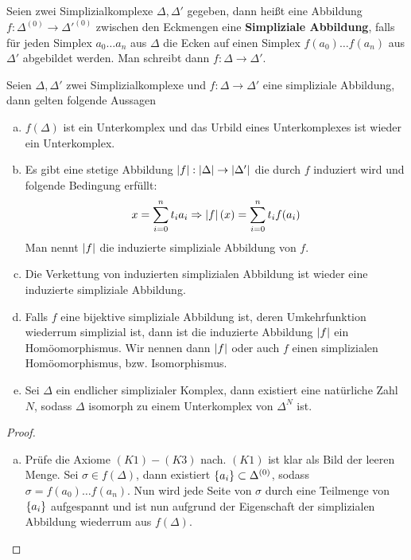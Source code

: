 \begin{Def} 
  Seien zwei Simplizialkomplexe $\Delta, \Delta'$ gegeben, dann heißt
  eine Abbildung $f: \Delta^{(0)} \rightarrow \Delta'^{(0)}$ zwischen
  den Eckmengen eine \textbf{Simpliziale Abbildung}, falls für jeden
  Simplex $a_0 \ldots a_n$ aus $\Delta$ die Ecken auf einen Simplex
  $f(a_0) \ldots f(a_n)$ aus $\Delta'$ abgebildet werden. Man schreibt
  dann $f: \Delta \rightarrow \Delta'$.
\end{Def}

\begin{Satz} \label{satz:geosimp}
  Seien $\Delta, \Delta'$ zwei Simplizialkomplexe und
  $f: \Delta \rightarrow \Delta'$ eine simpliziale Abbildung, dann
  gelten folgende Aussagen
	\begin{enumerate}[(a)]
        \item $f(\Delta)$ ist ein Unterkomplex und das Urbild eines
          Unterkomplexes ist wieder ein Unterkomplex.
        \item Es gibt eine stetige Abbildung
          $\left| f \right| : \left| \Delta \right| \rightarrow \left| \Delta' \right|$ die durch
          $f$ induziert wird und folgende Bedingung erfüllt:
          \begin{gather*}
            x = \sum\limits_{i=0}^{n} t_i a_i \Rightarrow \left| f \right|(x) = \sum\limits_{i=0}^{n}
            t_i f(a_i)
          \end{gather*}
          Man nennt $\left| f \right|$ die induzierte simpliziale Abbildung von
          $f$.
        \item Die Verkettung von induzierten simplizialen Abbildung
          ist wieder eine induzierte simpliziale Abbildung.
        \item Falls $f$ eine bijektive simpliziale Abbildung ist,
          deren Umkehrfunktion wiederrum simplizial ist, dann ist die
          induzierte Abbildung $\left| f \right|$ ein Homöomorphismus. Wir
          nennen dann $\left| f \right|$ oder auch $f$ einen simplizialen
          Homöomorphismus, bzw. Isomorphismus.
        \item Sei $\Delta$ ein endlicher simplizialer Komplex, dann
          existiert eine natürliche Zahl $N$, sodass $\Delta$
          isomorph zu einem Unterkomplex von $\Delta^N$ ist.
	\end{enumerate}
	\begin{proof}
          \begin{enumerate}[(a)]
          \item Prüfe die Axiome $(K1)-(K3)$ nach. $(K1)$ ist klar als
            Bild der leeren Menge. Sei $\sigma \in f(\Delta)$, dann
            existiert $\left\{ a_i \right\} \subset \Delta^{(0)}$, sodass
            $\sigma = f(a_0)\ldots f(a_n)$. Nun wird jede Seite von
            $\sigma$ durch eine Teilmenge von $\left\{ a_i \right\}$ aufgespannt
            und ist nun aufgrund der Eigenschaft der simplizialen
            Abbildung wiederrum aus $f(\Delta)$. 


\end{enumerate}
\end{proof}
\end{Satz}
